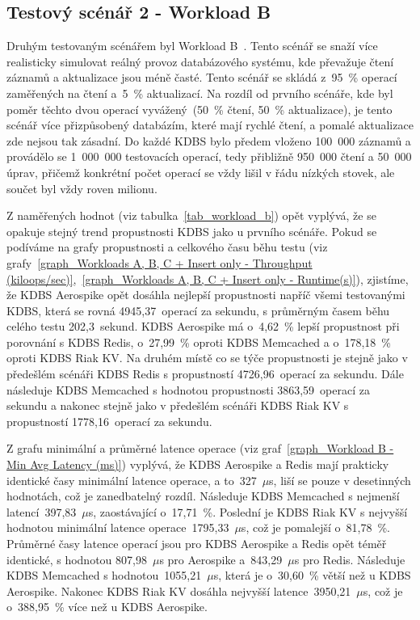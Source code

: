 \documentclass[czech,master,dept460,male,csharp,cpdeclaration]{diploma}
\begin{document}
	\subsection{Testový scénář 2 - Workload B}
	
	Druhým testovaným scénářem byl Workload B~\cite{workloads}. Tento scénář se snaží více realisticky simulovat reálný provoz databázového systému, kde převažuje čtení záznamů a aktualizace jsou méně časté. Tento scénář se skládá z~95~\% operací zaměřených na čtení a~5~\% aktualizací. Na rozdíl od prvního scénáře, kde byl poměr těchto dvou operací vyvážený~(50~\% čtení, 50~\% aktualizace), je tento scénář více přizpůsobený databázím, které mají rychlé čtení, a pomalé aktualizace zde nejsou tak zásadní. Do každé KDBS bylo předem vloženo 100~000 záznamů a provádělo se 1~000~000 testovacích operací, tedy přibližně 950~000 čtení a 50~000 úprav, přičemž konkrétní počet operací se vždy lišil v řádu nízkých stovek, ale součet byl vždy roven milionu.
	
	Z naměřených hodnot (viz tabulka~\ref{tab_workload_b}) opět vyplývá, že se opakuje stejný trend propustnosti KDBS jako u prvního scénáře. Pokud se podíváme na grafy propustnosti a celkového času běhu testu (viz grafy~\ref{graph_Workloads A, B, C + Insert only - Throughput (kiloops/sec)},~\ref{graph_Workloads A, B, C + Insert only - Runtime(s)}), zjistíme, že KDBS Aerospike opět dosáhla nejlepší propustnosti napříč všemi testovanými KDBS, která se rovná 4945,37~operací za sekundu, s průměrným časem běhu celého testu 202,3~sekund. KDBS Aerospike má o~4,62~\% lepší propustnost při porovnání s KDBS Redis, o~27,99~\% oproti KDBS Memcached a o~178,18~\% oproti KDBS Riak KV. Na druhém místě co se týče propustnosti je stejně jako v předešlém scénáři KDBS Redis s propustností 4726,96~operací za sekundu. Dále následuje KDBS Memcached s hodnotou propustnosti 3863,59~operací za sekundu a nakonec stejně jako v předešlém scénáři KDBS Riak KV s propustností 1778,16~operací za sekundu.
	
	Z grafu minimální a průměrné latence operace (viz graf~\ref{graph_Workload B - Min Avg Latency (ms)}) vyplývá, že KDBS Aerospike a Redis mají prakticky identické časy minimální latence operace, a to~327~$\mu$s, liší se pouze v desetinných hodnotách, což je zanedbatelný rozdíl. Následuje KDBS Memcached s nejmenší latencí~397,83~$\mu$s, zaostávající o~17,71~\%. Poslední je KDBS Riak KV s nejvyšší hodnotou minimální latence operace~1795,33~$\mu$s, což je pomalejší o~81,78~\%. Průměrné časy latence operací jsou pro KDBS Aerospike a Redis opět téměř identické, s hodnotou 807,98~$\mu$s pro Aerospike a~843,29~$\mu$s pro Redis. Následuje KDBS Memcached s hodnotou~1055,21~$\mu$s, která je o~30,60~\% větší než u KDBS Aerospike. Nakonec KDBS Riak KV dosáhla nejvyšší latence~3950,21~$\mu$s, což je o~388,95~\% více než u KDBS Aerospike.
	
\end{document}
